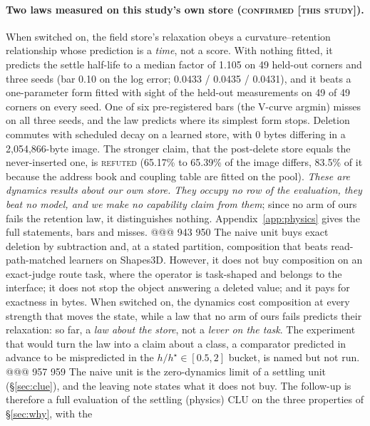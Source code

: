 \paragraph{Two laws measured on this study's own store (\textsc{confirmed [this study]}).}
When switched on, the field store's relaxation obeys a curvature--retention relationship whose
prediction is a \emph{time}, not a score. With nothing fitted, it predicts the settle half-life to
a median factor of 1.105 on 49 held-out corners and three seeds (bar 0.10 on the log error; 0.0433
/ 0.0435 / 0.0431), and it beats a one-parameter form fitted with sight of the held-out
measurements on 49 of 49 corners on every seed. One of six pre-registered bars (the V-curve
argmin) misses on all three seeds, and the law predicts where its simplest form stops.
Deletion commutes with scheduled decay on a learned store, with 0 bytes differing in a
2,054,866-byte image. The stronger claim, that the post-delete store equals the never-inserted
one, is \textsc{refuted} (65.17\% to 65.39\% of the image differs, 83.5\% of it because the
address book and coupling table are fitted on the pool). %
\emph{These are dynamics results about our own store. They occupy no row of the evaluation, they
beat no model, and we make no capability claim from them}; since no arm of ours fails the
retention law, it distinguishes nothing. Appendix~\ref{app:physics} gives the full statements,
bars and misses.
@@@ 943 950
The naive unit buys exact deletion by subtraction and, at a stated partition, composition that
beats read-path-matched learners on Shapes3D. However, it does not buy composition on an
exact-judge route task, where the operator is task-shaped and belongs to the interface; it does
not stop the object answering a deleted value; and it pays for exactness in bytes. When switched
on, the dynamics cost composition at every strength that moves the state, while a law that no arm
of ours fails predicts their relaxation: so far, a \emph{law about the store}, not a \emph{lever on
the task}. The experiment that would turn the law into a claim about a class, a comparator
predicted in advance to be mispredicted in the $h/h^\star\in[0.5,2]$ bucket, is named but not run. %
@@@ 957 959
The naive unit is the zero-dynamics limit of a settling unit (\S\ref{sec:clue}), and the
leaving note states what it does not buy. The follow-up is therefore a full
evaluation of the settling (physics) CLU on the three properties of \S\ref{sec:why}, with the
